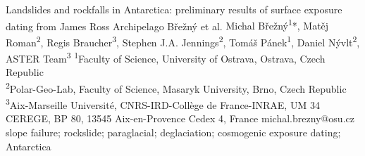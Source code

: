 \abstract
{Landslides and rockfalls in Antarctica: preliminary results of surface exposure dating from James Ross Archipelago} 
{Břežný et al.} 
{Michal Břežný\textsuperscript{1}*, Matěj Roman\textsuperscript{2}, Regis Braucher\textsuperscript{3}, Stephen J.A. Jennings\textsuperscript{2}, Tomáš Pánek\textsuperscript{1}, Daniel Nývlt\textsuperscript{2}, ASTER Team\textsuperscript{3}} 
{\TLtag} 
{
\textsuperscript{1}Faculty of Science, University of Ostrava, Ostrava, Czech Republic\\
\textsuperscript{2}Polar-Geo-Lab, Faculty of Science, Masaryk University, Brno, Czech Republic\\
\textsuperscript{3}Aix-Marseille Université, CNRS-IRD-Collège de France-INRAE, UM 34 CEREGE, BP 80, 13545 Aix-en-Provence Cedex 4, France
}
{michal.brezny@osu.cz}  %
{slope failure; rockslide; paraglacial; deglaciation; cosmogenic exposure dating; Antarctica}
